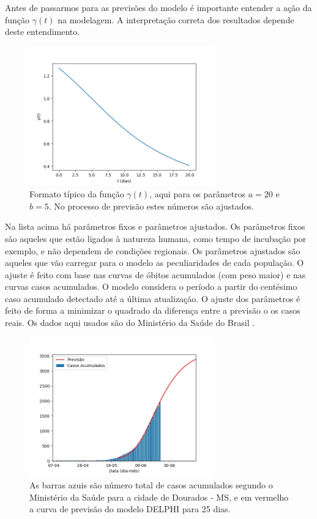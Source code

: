 \documentclass[12pt]{article}
\begin{document}
Antes de passarmos para as previsões do modelo é importante entender a ação da função $\gamma(t)$ na modelagem. A interpretação correta dos resultados depende deste entendimento.
\begin{figure}[t]
 \centering
 \includegraphics[width = 8cm]{figs/gamma_1.png}
 \caption{Formato típico da função $\gamma (t)$, aqui para os parâmetros $a = 20$ e $b = 5$. No processo de previsão estes números são ajustados.}
 \label{gamma}
\end{figure}


Na lista acima há parâmetros fixos e parâmetros ajustados. Os parâmetros fixos são aqueles que estão ligados à natureza humana, como tempo de incubação por exemplo, e não dependem de condições regionais. Os parâmetros ajustados são aqueles que vão carregar para o modelo as peculiaridades de cada população. O ajuste é feito com base nas curvas de óbitos acumulados (com peso maior) e nas curvas casos acumulados. O modelo considera o período a partir do centésimo caso acumulado detectado até a última atualização. O ajuste dos parâmetros é feito de forma a minimizar o quadrado da diferença entre a previsão o os casos reais. Os dados aqui usados são do Ministério da Saúde do Brasil \cite{minsaude}.  

\begin{figure}[t]
 \centering
 \includegraphics[width = 8cm]{figs/Fig_Brasil_MS_Dourados_casos_20200624_025dias.jpg}
 \caption{As barras azuis são número total de casos acumulados segundo o Ministério da Saúde para a cidade de Dourados - MS, e em vermelho a curva de previsão do modelo DELPHI para 25 dias.}
 \label{proj_casos}
\end{figure}
\end{document}
